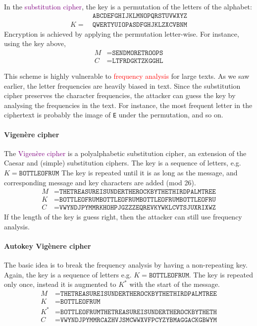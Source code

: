 \documentclass[a4paper, 11pt, openany]{book}
\numberwithin{equation}{section}
\theoremstyle{plain}
\theoremstyle{definition}
\newcommand{\Important}[1]{\textcolor{red}{#1}}
\newcommand{\Define}[1]{\textcolor{purple}{#1}}
\begin{document}
In the \Define{substitution cipher}, the key is a permutation of the letters of the alphabet:
\begin{align*}
          &\texttt{ABCDEFGHIJKLMNOPQRSTUVWXYZ}\\
       K = \ &\texttt{QWERTYUIOPASDFGHJKLZXCVBNM}
\end{align*}
Encryption is achieved by applying the permutation letter-wise. For instance, using the key above,
\begin{align*}
    M &= \texttt{SENDMORETROOPS}\\
    C &= \texttt{LTFRDGKTZKGGHL}
\end{align*}

This scheme is highly vulnerable to \Important{frequency analysis} for large texts. As we saw earlier, the letter frequencies are heavily biased in text. Since the substitution cipher preserves the character frequencies, the attacker can guess the key by analysing the frequencies in the text. For instance, the most frequent letter in the ciphertext is probably the image of \texttt{E} under the permutation, and so on.




\paragraph{Vigen\`ere cipher}
    
The \Define{Vigen\`ere cipher} is a polyalphabetic substitution cipher, an extension of the Caesar and (simple) substitution ciphers. The key is a sequence of letters, e.g. $K = \texttt{BOTTLEOFRUM}$
The key is repeated until it is as long as the message, and corresponding message and key characters are added (mod 26).
\begin{align*}
    M &= \texttt{THETREASUREISUNDERTHEROCKBYTHETHIRDPALMTREE}\\
    K &= \texttt{BOTTLEOFRUMBOTTLEOFRUMBOTTLEOFRUMBOTTLEOFRU}\\
    C &= \texttt{VWYNDJPYMMRKHOHPJGZZZEQREVKYWKLCVTSJUXRIXWZ}
\end{align*}
If the length of the key is guess right, then the attacker can still use frequency analysis.



\paragraph{Autokey Vig\`enere cipher}
The basic idea is to break the frequency analysis by having a non-repeating key. Again, the key is a sequence of letters e.g. $K = \texttt{BOTTLEOFRUM}$. The key is repeated only once, instead it is augmented to $K^*$ with the start of the message.
\begin{align*}
    M &= \texttt{THETREASUREISUNDERTHEROCKBYTHETHIRDPALMTREE}\\
    K &= \texttt{BOTTLEOFRUM}\\
    K^* &= \texttt{BOTTLEOFRUMTHETREASUREISUNDERTHEROCKBYTHETH}\\
    C &= \texttt{VWYNDJPYMMRCAZHVJSMCWWXVFPCYZYBMAGGACKGBWYM}
\end{align*}
\end{document}
